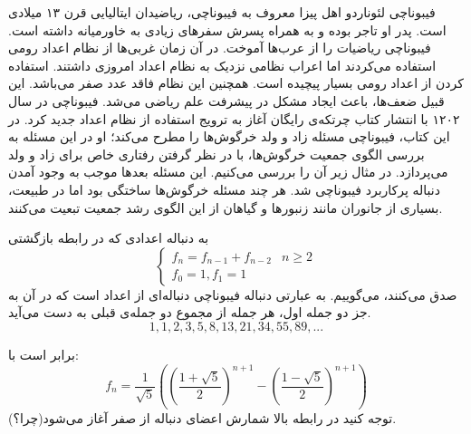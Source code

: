 \begin{EXTRA}{ فیبوناچی }
\p
لئوناردو اهل پیزا
معروف به
فیبوناچی،
 ریاضیدان ایتالیایی قرن 
۱۳
میلادی
است.
پدر او تاجر بوده و به همراه پسرش سفرهای زیادی به خاورمیانه داشته است.
فیبوناچی ریاضیات را از عرب‌ها آموخت.
در آن زمان غربی‌ها از نظام اعداد رومی استفاده می‌کردند اما اعراب نظامی نزدیک به نظام اعداد امروزی داشتند.
استفاده کردن از اعداد رومی بسیار پیچیده‌ است. همچنین این نظام فاقد عدد صفر می‌باشد. این قبیل ضعف‌ها، باعث ایجاد مشکل در پیشرفت علم ریاضی می‌شد.
فیبوناچی در سال ۱۲۰۲ با انتشار کتاب
چرتکه‌ی رایگان
آغاز به
ترویج استفاده از نظام اعداد جدید کرد.
در این کتاب، فیبوناچی مسئله زاد و ولد خرگوش‌ها را مطرح می‌کند؛ او در این مسئله به بررسی الگوی جمعیت خرگوش‌ها، با در نظر گرفتن رفتاری خاص برای زاد و ولد می‌پردازد. در مثال زیر آن را بررسی می‌کنیم.
این مسئله بعدها  موجب به وجود آمدن دنباله پرکاربرد فیبوناچی شد.
هر چند مسئله خرگوش‌ها ساختگی بود اما در طبیعت، بسیاری از جانوران مانند زنبورها و گیاهان از این الگوی رشد جمعیت تبعیت می‌کنند.
\end{EXTRA}



\begin{DEFINITION}
  \p
    به دنباله اعدادی که در رابطه بازگشتی
  \[\begin{cases}
      f_{n}=f_{n-1} + f_{n-2} & n\geq 2 \\
      
      f_0=1 ,
      f_1 = 1
  \end{cases}
  \]
  صدق می‌کنند،
    می‌گوییم.
    به عبارتی دنباله فیبوناچی
    دنباله‌ای از اعداد است که در آن به جز دو جمله اول، هر جمله از مجموع دو جمله‌ی قبلی به دست می‌آید.
    \p
  $$1, 1, 2, 3, 5, 8, 13, 21, 34, 55, 89, ...$$
\end{DEFINITION}





\begin{THEOREM}
    \p
    برابر است با:
    $$f_n = \frac{1}{\sqrt{5}}((\frac{1 + \sqrt{5}}{2})^{n+1} - (\frac{1 - \sqrt{5}}{2})^{n+1})$$
    توجه کنید در رابطه بالا شمارش اعضای دنباله از صفر آغاز می‌شود(چرا؟).
\end{THEOREM}


